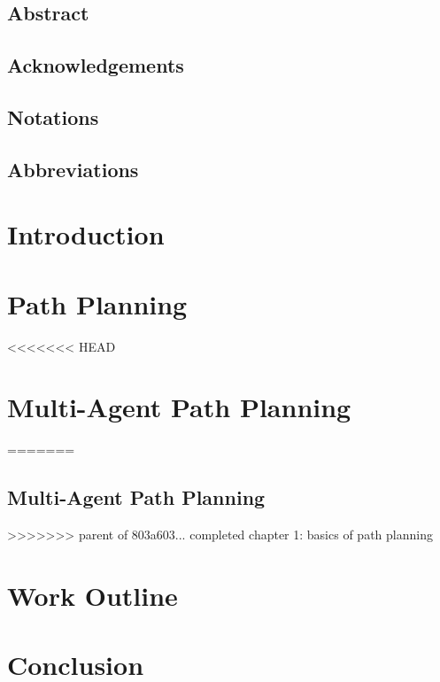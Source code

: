 \documentclass{thesisreport}
\begin{document}
  
 
\section*{Abstract}
 
\section*{Acknowledgements}

\section*{Notations}

\section*{Abbreviations}
 
\listoffigures

\listoftables

\tableofcontents


\chapter*{Introduction}
 

\chapter{Path Planning}
 
<<<<<<< HEAD
\chapter{Multi-Agent Path Planning}
=======
\section{Multi-Agent Path Planning} 
>>>>>>> parent of 803a603... completed chapter 1: basics of path planning
 
\chapter{Work Outline}
 
\chapter*{Conclusion}
 
  
\newpage


 

 
 
 
 
\end{document}
